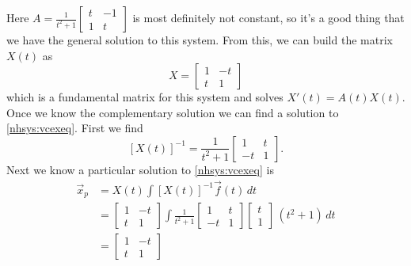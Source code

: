 \documentclass{ximera}
\begin{document}
\begin{exampleSol}
    Here $A = \frac{1}{t^2+1}
    \left[ \begin{smallmatrix}
        t & -1 \\
        1 & t
    \end{smallmatrix} \right]$ 
    is most definitely not constant, so it's a good thing that we have the general solution to this system. From this, we can build the matrix $X(t)$ as 
    \begin{equation*}
    X = 
    \begin{bmatrix}
        1 & -t \\
        t & 1
    \end{bmatrix}
    \end{equation*} 
    which is a fundamental matrix for this system and solves $X'(t) = A(t) X(t)$.  Once we know the complementary solution we can find a solution to \eqref{nhsys:vcexeq}.  First we find
    \begin{equation*}
        \left[ X(t) \right]^{-1} = \frac{1}{t^2+1}
        \begin{bmatrix}
            1 & t \\
            -t & 1
        \end{bmatrix} .
    \end{equation*}
    Next we know a particular solution to \eqref{nhsys:vcexeq} is
    \begin{equation*}
        \begin{split}
            \vec{x}_p & = X(t) \int \left[X(t)\right]^{-1}\vec{f}(t) \, dt  \\
            & = 
            \begin{bmatrix}
                1 & -t \\
                t & 1
            \end{bmatrix} 
            \int \frac{1}{t^2+1}
            \begin{bmatrix}
                1 & t \\
                -t & 1
            \end{bmatrix}
            \begin{bmatrix} 
                t \\ 
                1 
            \end{bmatrix} 
            \,(t^2+1) \,dt \\
            & =
            \begin{bmatrix}
                1 & -t \\
                t & 1

\end{bmatrix}
\end{split}
\end{equation*}
\end{exampleSol}
\end{document}
